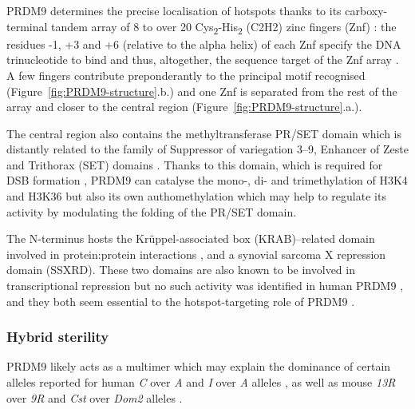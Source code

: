 PRDM9 determines the precise localisation of hotspots thanks to its carboxy-terminal tandem array of 8 to over 20 Cys\textsubscript{2}-His\textsubscript{2} (C2H2) zinc fingers (Znf) \citep[reviewed in][]{paigen2018prdm9}: the residues -1, +3 and +6 (relative to the alpha helix) of each Znf specify the DNA trinucleotide to bind and thus, altogether, the sequence target of the Znf array \citep{neale2010prdm9}.
A few fingers contribute preponderantly to the principal motif recognised (Figure~\ref{fig:PRDM9-structure}.b.) and one Znf is separated from the rest of the array and closer to the central region (Figure~\ref{fig:PRDM9-structure}.a.).

The central region also contains the methyltransferase PR/SET domain which is distantly related to the family of Suppressor of variegation 3–9, Enhancer of Zeste and Trithorax (SET) domains \citep[reviewed in][]{grey2018prdm9}.
Thanks to this domain, which is required for DSB formation \citep{diagouraga2018prdm9}, PRDM9 can catalyse the mono-, di- and trimethylation of H3K4 and H3K36 \citep{wu2013molecular,powers2016meiotic} but also its own authomethylation \citep{koh-stenta2017discovery} which may help to regulate its activity by modulating the folding of the PR/SET domain.

The N-terminus hosts the Kr\"uppel-associated box (KRAB)–related domain involved in protein:protein interactions \citep{parvanov2016prdm9,parvanov2017prdm9,imai2017prdm9}, and a synovial sarcoma X repression domain (SSXRD).
These two domains are also known to be involved in transcriptional repression \citep{margolin1994kruppelassociated,lim1998krabrelated} but no such activity was identified in human PRDM9 \citep{born2014bsubdomain}, and they both seem essential to the hotspot-targeting role of PRDM9 \citep{baker2017repeated,thibault-sennett2018interrogating}.


\subsubsection{Hybrid sterility}

PRDM9 likely acts as a multimer \citep{baker2015multimer,altemose2017map,schwarz2018prdm9} which may explain the dominance of certain alleles reported for human \textit{C} over \textit{A} \citep{pratto2014recombination} and \textit{I} over \textit{A} alleles \citep{baudat2010prdm9}, as well as mouse \textit{13R} over \textit{9R} \citep{brick2012genetic} and \textit{Cst} over \textit{Dom2} alleles \citep{smagulova2011genomewide, baker2015multimer, baker2015prdm9}.

